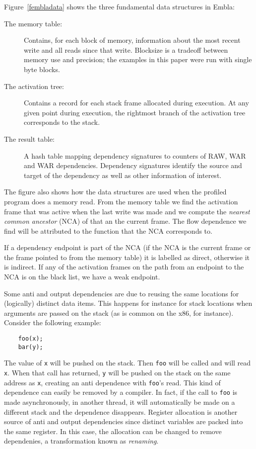 Figure~\ref{fembladata} shows the three fundamental data structures 
in Embla:
\begin{description}
\item[The memory table:]
Contains, for each block of memory, information about the most 
recent write and all reads since that write. 
Blocksize is a tradeoff between memory use and precision; the examples in 
this paper were run with single byte blocks. 
\item[The activation tree:]
Contains a record for each stack frame allocated during execution. 
At any given point during execution, 
the rightmost branch of the activation tree corresponds to the stack.
\item[The result table:]
A hash table mapping dependency signatures to counters of RAW, WAR 
and WAR dependencies. Dependency signatures identify the source and
target of the dependency as well as other information of interest.
\end{description}
The figure also shows how the data structures are used when the
profiled program does a memory read. From the memory table we find the
activation frame that was active when the last write was made and we
compute the {\em nearest common ancestor} (NCA) of that an the
current frame. The flow dependence we find will be attributed to the
function that the NCA corresponds to. 

If a dependency endpoint is part of the NCA (if the NCA is the current
frame or the frame pointed to from the memory table) it is labelled as
direct, otherwise it is indirect. If any of the activation frames on
the path from an endpoint to the NCA is on the black list, we have a
weak endpoint.


Some anti and output dependencies are due to reusing the same
locations for (logically) distinct data items. This happens for
instance for stack locations when arguments are passed on the stack
(as is common on the x86, for instance). Consider the following
example:
\begin{verbatim}
    foo(x);
    bar(y);
\end{verbatim}
The value of {\tt x} will be pushed on the stack. Then {\tt foo} will
be called and will read {\tt x}. When that call has returned, {\tt y}
will be pushed on the stack on the same address as {\tt x}, creating
an anti dependence with {\tt foo}'s read. This kind of dependence can 
easily be removed by a
compiler. In fact, if the call to {\tt foo} is made asynchronously, in
another thread, it will automatically be made on a different stack and
the dependence disappears. Register allocation is another source of
anti and output dependencies since distinct variables are packed into
the same register. In this case, the allocation can be changed to
remove dependenies, a transformation known as {\em renaming}.

